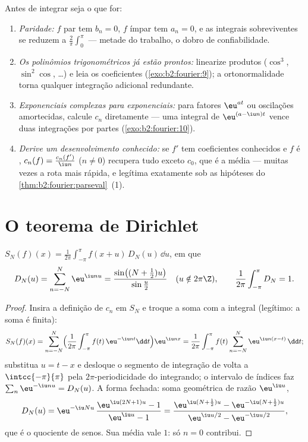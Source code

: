 \begin{method}\label{met:b2:fourier:coefficients}
Antes de integrar seja o que for:
\begin{enumerate}
  \item \emph{Paridade:} $f$ par tem $b_n = 0$, $f$ ímpar tem $a_n
        = 0$, e as integrais sobreviventes se reduzem a $\frac2\pi
        \int_0^\pi$ --- metade do trabalho, o dobro de confiabilidade.
  \item \emph{Os polinômios trigonométricos já estão prontos:}
        linearize produtos ($\cos^3$, $\sin^2\cos$, \dots) e
        leia os coeficientes
        (\cref{exo:b2:fourier:9}); a ortonormalidade torna qualquer
        integração adicional redundante.
  \item \emph{Exponenciais complexas para exponenciais:} para
        fatores $\eu^{at}$ ou oscilações amortecidas, calcule
        $c_n$ diretamente --- uma integral de $\eu^{(a - \iu
        n)t}$ vence duas integrações por partes
        (\cref{exo:b2:fourier:10}).
  \item \emph{Derive um desenvolvimento conhecido:} se $f' $ tem
        coeficientes conhecidos e $f$ é , $c_n(f) =
        \frac{c_n(f')}{\iu n}$ ($n \neq 0$) recupera tudo exceto
        $c_0$, que é a média --- muitas vezes a rota mais rápida,
        e legítima exatamente sob as hipóteses do
        \cref{thm:b2:fourier:parseval}~(1).
\end{enumerate}
\end{method}

\section{O teorema de Dirichlet}

\begin{lemma}\label{lem:b2:fourier:kernel}
$S_N(f)(x) = \frac{1}{2\pi}\int_{-\pi}^{\pi} f(x + u)\,D_N(u)\,\dd
u$, em que
\[
D_N(u) = \sum_{n=-N}^{N} \eu^{\iu nu}
= \frac{\sin\bigl((N + \frac12)u\bigr)}{\sin\frac u2}
\quad (u \notin 2\pi\Z),
\qquad
\frac{1}{2\pi}\int_{-\pi}^{\pi} D_N = 1 .
\]
\end{lemma}

\begin{proof}
Insira a definição de $c_n$ em $S_N$ e troque a soma com a integral
(legítimo: a soma é finita):
\[
S_N(f)(x)
= \sum_{n=-N}^{N}\Bigl(\frac{1}{2\pi}\int_{-\pi}^{\pi}
f(t)\,\eu^{-\iu nt}\dd t\Bigr)\eu^{\iu nx}
= \frac{1}{2\pi}\int_{-\pi}^{\pi} f(t)
\sum_{n=-N}^{N}\eu^{\iu n(x-t)}\,\dd t ;
\]
substitua $u = t - x$ e desloque o segmento de integração de volta
a $\intcc{-\pi}{\pi}$ pela $2\pi$-periodicidade do integrando;
o intervalo  de índices faz $\sum_n\eu^{-\iu nu} = D_N(u)$.
A forma fechada: soma geométrica de razão $\eu^{\iu u}$,
\[
D_N(u) = \eu^{-\iu Nu}\,\frac{\eu^{\iu(2N+1)u} - 1}{\eu^{\iu u} -
1}
= \frac{\eu^{\iu(N + \frac12)u} - \eu^{-\iu(N+\frac12)u}}
{\eu^{\iu u/2} - \eu^{-\iu u/2}} ,
\]
que é o quociente de senos. Sua média vale $1$: só $n = 0$
contribui.
\end{proof}

